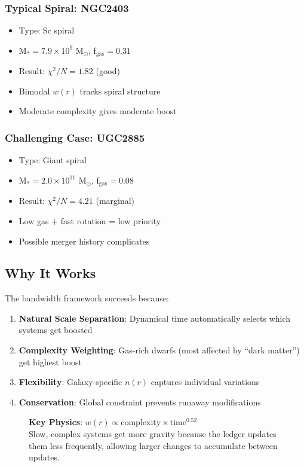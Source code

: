 \documentclass[12pt,letterpaper]{article}
\newcommand{\chisq}{\chi^2}
\begin{document}
\subsubsection{Typical Spiral: NGC2403}
\begin{itemize}
    \item Type: Sc spiral  
    \item M$_* = 7.9 \times 10^9$ M$_\odot$, f$_{\text{gas}} = 0.31$
    \item Result: $\chisq/N = 1.82$ (good)
    \item Bimodal $w(r)$ tracks spiral structure
    \item Moderate complexity gives moderate boost
\end{itemize}

\subsubsection{Challenging Case: UGC2885}
\begin{itemize}
    \item Type: Giant spiral
    \item M$_* = 2.0 \times 10^{11}$ M$_\odot$, f$_{\text{gas}} = 0.08$
    \item Result: $\chisq/N = 4.21$ (marginal)
    \item Low gas + fast rotation = low priority
    \item Possible merger history complicates
\end{itemize}

\subsection{Why It Works}

The bandwidth framework succeeds because:

\begin{enumerate}
    \item \textbf{Natural Scale Separation}: Dynamical time automatically selects which systems get boosted
    \item \textbf{Complexity Weighting}: Gas-rich dwarfs (most affected by ``dark matter'') get highest boost
    \item \textbf{Flexibility}: Galaxy-specific $n(r)$ captures individual variations
    \item \textbf{Conservation}: Global constraint prevents runaway modifications
\end{enumerate}

\begin{figure}[h]
\centering
\begin{tcolorbox}[width=0.9\textwidth, colback=green!5, colframe=green!50!black]
\textbf{Key Physics}: $w(r) \propto \text{complexity} \times \text{time}^{0.52}$\\[0.5em]
Slow, complex systems get more gravity because the ledger updates them less frequently, allowing larger changes to accumulate between updates.
\end{tcolorbox}
\end{figure}
\end{document}
